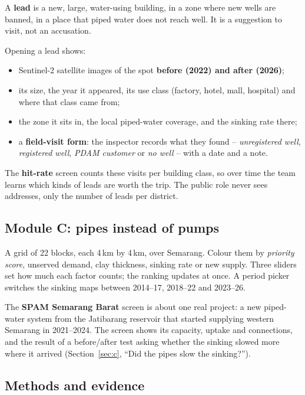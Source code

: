 \documentclass[11pt,a4paper]{article}
\begin{document}
A \textbf{lead} is a new, large, water-using building, in a zone where new wells are banned, in a place
that piped water does not reach well. It is a suggestion to visit, not an accusation.

Opening a lead shows:
\begin{itemize}
\item Sentinel-2 satellite images of the spot \textbf{before (2022) and after (2026)};
\item its size, the year it appeared, its use class (factory, hotel, mall, hospital) and where that
  class came from;
\item the zone it sits in, the local piped-water coverage, and the sinking rate there;
\item a \textbf{field-visit form}: the inspector records what they found -- \emph{unregistered well},
  \emph{registered well}, \emph{PDAM customer} or \emph{no well} -- with a date and a note.
\end{itemize}

The \textbf{hit-rate} screen counts these visits per building class, so over time the team learns which
kinds of leads are worth the trip. The public role never sees addresses, only the number of leads per
district.

\subsection{Module C: pipes instead of pumps}

\begin{tryit}
A grid of 22 blocks, each 4\,km by 4\,km, over Semarang. Colour them by \emph{priority score}, unserved
demand, clay thickness, sinking rate or new supply. Three sliders set how much each factor counts; the
ranking updates at once. A period picker switches the sinking maps between 2014--17, 2018--22 and
2023--26.
\end{tryit}

The \textbf{SPAM Semarang Barat} screen is about one real project: a new piped-water system from the
Jatibarang reservoir that started supplying western Semarang in 2021--2024. The screen shows its capacity,
uptake and connections, and the result of a before/after test asking whether the sinking slowed more where
it arrived (Section~\ref{sec:c}, ``Did the pipes slow the sinking?'').

\subsection{Methods and evidence}
\end{document}
